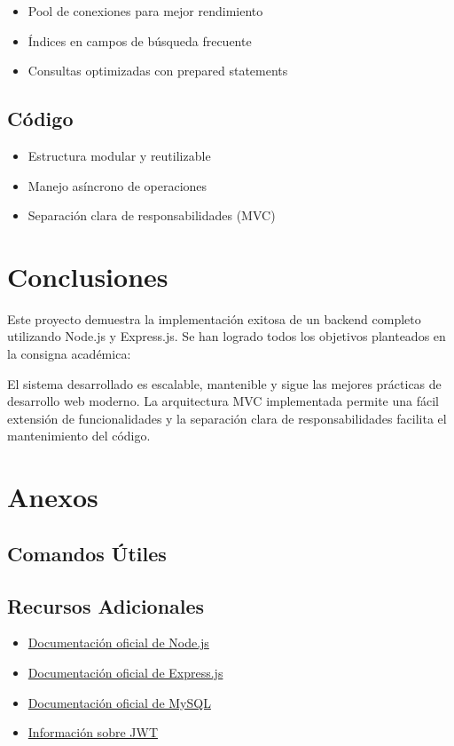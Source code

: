 \documentclass[12pt,a4paper]{article}
\begin{document}
\begin{itemize}
    \item Pool de conexiones para mejor rendimiento
    \item Índices en campos de búsqueda frecuente
    \item Consultas optimizadas con prepared statements
\end{itemize}

\subsection{Código}

\begin{itemize}
    \item Estructura modular y reutilizable
    \item Manejo asíncrono de operaciones
    \item Separación clara de responsabilidades (MVC)
\end{itemize}

\section{Conclusiones}

Este proyecto demuestra la implementación exitosa de un backend completo utilizando Node.js y Express.js. Se han logrado todos los objetivos planteados en la consigna académica:



El sistema desarrollado es escalable, mantenible y sigue las mejores prácticas de desarrollo web moderno. La arquitectura MVC implementada permite una fácil extensión de funcionalidades y la separación clara de responsabilidades facilita el mantenimiento del código.

\section{Anexos}

\subsection{Comandos Útiles}


\subsection{Recursos Adicionales}

\begin{itemize}
    \item \href{https://nodejs.org/}{Documentación oficial de Node.js}
    \item \href{https://expressjs.com/}{Documentación oficial de Express.js}
    \item \href{https://www.mysql.com/}{Documentación oficial de MySQL}
    \item \href{https://jwt.io/}{Información sobre JWT}
\end{itemize}
\end{document}
